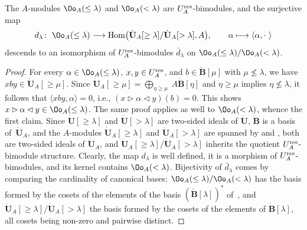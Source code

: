 \begin{lem} The $A$-modules $\Oo_A(\leq \lambda)$ and $\Oo_A(< \lambda)$ are $U_A^{\rm res}$-bimodules, and the surjective map
\begin{gather}\label{dlambdamap}
d_\lambda\colon\ \Oo_A(\leq \lambda)\longrightarrow {\rm Hom}\bigl( \dot{\mathbf{U}}_A [\geq \lambda]/ \dot{\mathbf{U}}_A [> \lambda],A\bigr),\qquad \alpha\longmapsto\langle \alpha , \cdot \ \rangle
\end{gather}
descends to an isomorphism of $U_A^{\rm res}$-bimodules $\bar{d}_\lambda$ on $\Oo_A(\leq \lambda)/\Oo_A(< \lambda)$.
\end{lem}
\begin{proof} For every $\alpha\in \Oo_A(\leq \lambda)$, $x,y\in U_A^{\rm res}$, and $b\in \dot{\mathbf{B}} [\mu]$ with $\mu \nleqslant \lambda$, we have $xby \in \dot{\mathbf{U}}_A [\geq \mu]$. Since $\dot{\mathbf{U}}_A [\geq \mu]= \bigoplus_{\eta\geq \mu}\ A\dot{\mathbf{B}}[\eta]$ and $\eta\geq \mu$ implies $\eta \nleqslant \lambda$, it follows that $\langle xby, \alpha\rangle=0$, i.e., $(x\rhd \alpha \lhd y)(b)=0$. This shows $x\rhd \alpha \lhd y \in \Oo_A(\leq \lambda)$. The same proof applies as well to $\Oo_A(<\lambda)$, whence the first claim. Since $\dot{\mathbf{U}} [\geq \lambda]$ and $\dot{\mathbf{U}} [> \lambda]$ are two-sided ideals of $\dot{\mathbf{U}}$, $\dot{\mathbf{B}}$ is a basis of~$\dot{\mathbf{U}}_A$, and the $A$-modules $\dot{\mathbf{U}}_A [\geq \lambda]$ and $\dot{\mathbf{U}}_A [> \lambda]$ are spanned by  and , both are two-sided ideals of $\dot{\mathbf{U}}_A$, and $\dot{\mathbf{U}}_A [\geq \lambda]/ \dot{\mathbf{U}}_A [> \lambda]$ inherits the quotient $U_A^{\rm res}$-bimodule structure. Clearly, the map $d_\lambda$ is well defined, it is a morphism of $U_A^{\rm res}$-bimodules, and its kernel contains $\Oo_A(< \lambda)$. Bijectivity of $\bar{d}_\lambda$ comes by comparing the cardinality of canonical bases: $\Oo_A(\leq \lambda)/\Oo_A(< \lambda)$ has the basis formed by the cosets of the elements of the basis $(\dot{\mathbf{B}}[\lambda])^*$ of~, and $\dot{\mathbf{U}}_A [\geq \lambda]/ \dot{\mathbf{U}}_A [> \lambda]$ the basis formed by the cosets of the elements of $\dot{\mathbf{B}}[\lambda]$, all cosets being non-zero and pairwise distinct.
\end{proof}

